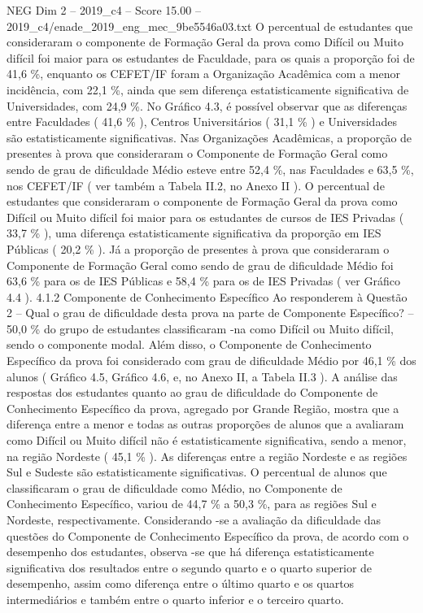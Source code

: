 \begin{textsample}{NEG Dim 2 – 2019\_c4 – Score 15.00 – 2019\_c4/enade\_2019\_eng\_mec\_9be5546a03.txt}
O percentual de estudantes que consideraram o componente de Formação Geral da prova como Difícil ou Muito difícil foi maior para os estudantes de Faculdade, para os quais a proporção foi de 41,6 \%, enquanto os CEFET/IF foram a Organização Acadêmica com a menor incidência, com 22,1 \%, ainda que sem diferença estatisticamente significativa de Universidades, com 24,9 \%.
No Gráfico 4.3, é possível observar que as diferenças entre Faculdades ( 41,6 \% ), Centros Universitários ( 31,1 \% ) e Universidades são estatisticamente significativas.
Nas Organizações Acadêmicas, a proporção de presentes à prova que consideraram o Componente de Formação Geral como sendo de grau de dificuldade Médio esteve entre 52,4 \%, nas Faculdades e 63,5 \%, nos CEFET/IF ( ver também a Tabela II.2, no Anexo II ).
O percentual de estudantes que consideraram o componente de Formação Geral da prova como Difícil ou Muito difícil foi maior para os estudantes de cursos de IES Privadas ( 33,7 \% ), uma diferença estatisticamente significativa da proporção em IES Públicas ( 20,2 \% ).
Já a proporção de presentes à prova que consideraram o Componente de Formação Geral como sendo de grau de dificuldade Médio foi 63,6 \% para os de IES Públicas e 58,4 \% para os de IES Privadas ( ver Gráfico 4.4 ). 4.1.2 Componente de Conhecimento Específico Ao responderem à Questão 2 – Qual o grau de dificuldade desta prova na parte de Componente Específico? – 50,0 \% do grupo de estudantes classificaram -na como Difícil ou Muito difícil, sendo o componente modal.
Além disso, o Componente de Conhecimento Específico da prova foi considerado com grau de dificuldade Médio por 46,1 \% dos alunos ( Gráfico 4.5, Gráfico 4.6, e, no Anexo II, a Tabela II.3 ).
A análise das respostas dos estudantes quanto ao grau de dificuldade do Componente de Conhecimento Específico da prova, agregado por Grande Região, mostra que a diferença entre a menor e todas as outras proporções de alunos que a avaliaram como Difícil ou Muito difícil não é estatisticamente significativa, sendo a menor, na região Nordeste ( 45,1 \% ).
As diferenças entre a região Nordeste e as regiões Sul e Sudeste são estatisticamente significativas.
O percentual de alunos que classificaram o grau de dificuldade como Médio, no Componente de Conhecimento Específico, variou de 44,7 \% a 50,3 \%, para as regiões Sul e Nordeste, respectivamente.
Considerando -se a avaliação da dificuldade das questões do Componente de Conhecimento Específico da prova, de acordo com o desempenho dos estudantes, observa -se que há diferença estatisticamente significativa dos resultados entre o segundo quarto e o quarto superior de desempenho, assim como diferença entre o último quarto e os quartos intermediários e também entre o quarto inferior e o terceiro quarto.

\end{textsample}
